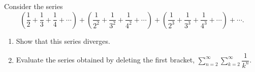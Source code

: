Consider the series
\[
\left(\dfrac{1}{2}+\dfrac{1}{3}+\dfrac{1}{4}+\cdots\right)+\left(\dfrac{1}{2^2}+\dfrac{1}{3^2}+\dfrac{1}{4^2}+\cdots\right)+\left(\dfrac{1}{2^3}+\dfrac{1}{3^3}+\dfrac{1}{4^3}+\cdots\right)+\cdots .
\]
\begin{enumerate}
\item[(a)] Show that this series diverges.
\item[(b)] Evaluate the series obtained by deleting the first bracket, $\displaystyle\sum_{n=2}^{\infty}\sum_{k=2}^{\infty}\dfrac{1}{k^n}$.
\end{enumerate}
